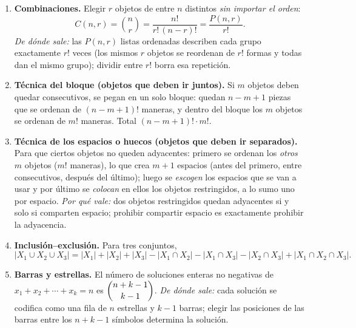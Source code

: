 \documentclass[11pt]{article}
\begin{document}
\begin{teo}
\begin{enumerate}[leftmargin=*]
  \item \textbf{Combinaciones.} Elegir $r$ objetos de entre $n$ distintos \emph{sin importar el orden}:
  \[
    C(n,r)=\binom{n}{r}=\frac{n!}{r!\,(n-r)!}=\frac{P(n,r)}{r!} .
  \]
  \emph{De d\'onde sale:} las $P(n,r)$ listas ordenadas describen cada grupo exactamente $r!$ veces (los mismos $r$ objetos se reordenan de $r!$ formas y todas dan el mismo grupo); dividir entre $r!$ borra esa repetici\'on.

  \item \textbf{T\'ecnica del bloque (objetos que deben ir juntos).} Si $m$ objetos deben quedar consecutivos, se pegan en un solo bloque: quedan $n-m+1$ piezas que se ordenan de $(n-m+1)!$ maneras, y dentro del bloque los $m$ objetos se ordenan de $m!$ maneras. Total $(n-m+1)!\cdot m!$.

  \item \textbf{T\'ecnica de los espacios o huecos (objetos que deben ir separados).} Para que ciertos objetos no queden adyacentes: primero se ordenan los \emph{otros} $m$ objetos ($m!$ maneras), lo que crea $m+1$ espacios (antes del primero, entre consecutivos, despu\'es del \'ultimo); luego se \emph{escogen} los espacios que se van a usar y por \'ultimo se \emph{colocan} en ellos los objetos restringidos, a lo sumo uno por espacio.
  \emph{Por qu\'e vale:} dos objetos restringidos quedan adyacentes si y solo si comparten espacio; prohibir compartir espacio es exactamente prohibir la adyacencia.

  \item \textbf{Inclusi\'on--exclusi\'on.} Para tres conjuntos,
  \[
    |X_1\cup X_2\cup X_3|=|X_1|+|X_2|+|X_3|-|X_1\cap X_2|-|X_1\cap X_3|-|X_2\cap X_3|+|X_1\cap X_2\cap X_3| .
  \]

  \item \textbf{Barras y estrellas.} El n\'umero de soluciones enteras no negativas de $x_1+x_2+\cdots+x_k=n$ es $\dbinom{n+k-1}{k-1}$.
  \emph{De d\'onde sale:} cada soluci\'on se codifica como una fila de $n$ estrellas y $k-1$ barras; elegir las posiciones de las barras entre los $n+k-1$ s\'imbolos determina la soluci\'on.
\end{enumerate}
\end{teo}
\end{document}
